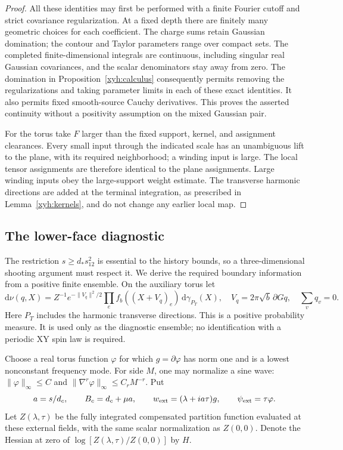 \begin{proof}
All these identities may first be performed with a finite Fourier
cutoff and strict covariance regularization.  At a fixed depth there
are finitely many geometric choices for each coefficient.  The charge
sums retain Gaussian domination; the contour and Taylor parameters
range over compact sets.  The completed finite-dimensional integrals
are continuous, including singular real Gaussian covariances, and
the scalar denominators stay away from zero.  The domination in
Proposition~\ref{xyh:calculus} consequently permits removing the
regularizations and taking parameter limits in each of these exact
identities.  It also permits fixed smooth-source Cauchy derivatives.
This proves the asserted continuity without a positivity assumption on
the mixed Gaussian pair.

For the torus take \(F\) larger than the fixed support, kernel, and
assignment clearances.  Every small input through the indicated scale
has an unambiguous lift to the plane, with its required neighborhood;
a winding input is large.  The local tensor assignments are therefore
identical to the plane assignments.  Large winding inputs obey the
large-support weight estimate.  The transverse harmonic directions
are added at the terminal integration, as prescribed in
Lemma~\ref{xyh:kernels}, and do not change any earlier local map.
\end{proof}

\subsection{The lower-face diagnostic}

The restriction \(s\ge d_*s_{12}^2\) is essential to the history bounds,
so a three-dimensional shooting argument must respect it.  We derive
the required boundary information from a positive finite ensemble.
On the auxiliary torus let
\[
 \mathrm d\nu(q,X)=Z^{-1}e^{-\|V_q\|^2/2}
     \prod_e f_b((X+V_q)_e)\,\mathrm d\gamma_{P_T}(X),
 \quad V_q=2\pi\sqrt b\,\partial Gq,
 \quad \sum_vq_v=0.
\]
Here \(P_T\) includes the harmonic transverse directions.  This is
a positive probability measure.  It is used only as the diagnostic
ensemble; no identification with a periodic XY spin law is required.

Choose a real torus function \(\varphi\) for which
\(g=\partial\varphi\) has norm one and is a lowest nonconstant
frequency mode.  For side \(M\), one may normalize a sine wave:
\(\|\varphi\|_\infty\le C\) and
\(\|\nabla^r\varphi\|_\infty\le C_rM^{-r}\).
Put
\[
 a=s/d_c,\qquad B_c=d_c+\mu a,
 \qquad w_{\rm ext}=(\lambda+i a\tau)g,
 \qquad \psi_{\rm ext}=\tau\varphi.
\]
Let \(Z(\lambda,\tau)\) be the fully integrated compensated partition
function evaluated at these external fields, with the same scalar
normalization as \(Z(0,0)\).  Denote the Hessian at zero of
\(\log[Z(\lambda,\tau)/Z(0,0)]\) by \(H\).

